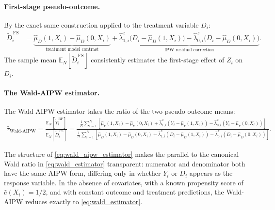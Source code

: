\documentclass[12pt,a4paper]{article}
\newcommand{\En}{\mathbb{E}_N}
\begin{document}
\paragraph{First-stage pseudo-outcome.}

By the exact same construction applied to the treatment variable $D_i$:
\begin{align}
    \widetilde{D}^{\,\mathrm{FS}}_i
    &=
    \underbrace{
        \hat{\mu}_D(1, X_i) - \hat{\mu}_D(0, X_i)
    }_{\text{treatment model contrast}}
    +
    \underbrace{
        \hat{\lambda}^z_{1,i}
        \bigl(D_i - \hat{\mu}_D(1, X_i)\bigr)
        -
        \hat{\lambda}^z_{0,i}
        \bigl(D_i - \hat{\mu}_D(0, X_i)\bigr)
    }_{\text{IPW residual correction}}.
    \label{eq:fs_pseudo}
\end{align}
The sample mean $\En[\widetilde{D}^{\,\mathrm{FS}}_i]$ consistently estimates the
first-stage effect of $Z_i$ on $D_i$.

\paragraph{The Wald-AIPW estimator.}

The Wald-AIPW estimator \citep{tan2006regression} takes the ratio of the two
pseudo-outcome means:
\begin{align}
    \hat{\tau}_{\mathrm{Wald\text{-}AIPW}}
    =
    \frac{
        \En\!\left[\widetilde{Y}^{\,\mathrm{RF}}_i\right]
    }{
        \En\!\left[\widetilde{D}^{\,\mathrm{FS}}_i\right]
    }
    =
    \frac{
        \frac{1}{N}\sum_{i=1}^{N}
        \left[
            \hat{\mu}_Y(1,X_i) - \hat{\mu}_Y(0,X_i)
            + \hat{\lambda}^z_{1,i}(Y_i - \hat{\mu}_Y(1,X_i))
            - \hat{\lambda}^z_{0,i}(Y_i - \hat{\mu}_Y(0,X_i))
        \right]
    }{
        \frac{1}{N}\sum_{i=1}^{N}
        \left[
            \hat{\mu}_D(1,X_i) - \hat{\mu}_D(0,X_i)
            + \hat{\lambda}^z_{1,i}(D_i - \hat{\mu}_D(1,X_i))
            - \hat{\lambda}^z_{0,i}(D_i - \hat{\mu}_D(0,X_i))
        \right]
    }.
    \label{eq:wald_aipw_estimator}
\end{align}

The structure of \eqref{eq:wald_aipw_estimator} makes the parallel to the canonical
Wald ratio in \eqref{eq:wald_estimator} transparent: numerator and denominator both
have the same AIPW form, differing only in whether $Y_i$ or $D_i$ appears as the
response variable. In the absence of covariates, with a known propensity score of
$\hat{e}(X_i) = 1/2$, and with constant outcome and treatment predictions, the
Wald-AIPW reduces exactly to \eqref{eq:wald_estimator}.
\end{document}
